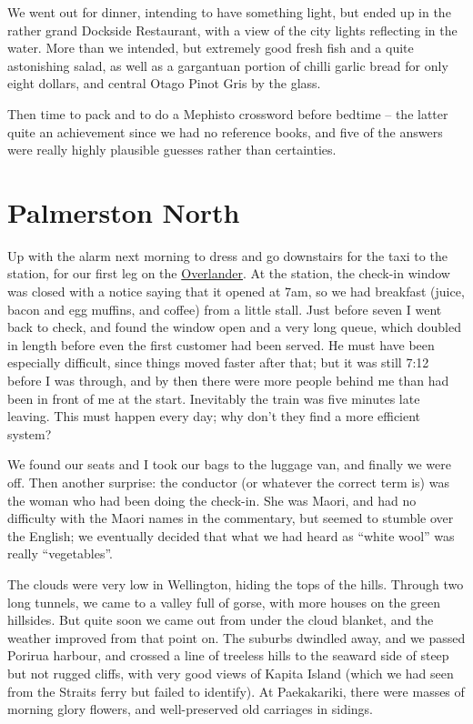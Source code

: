 \documentclass[12pt,a4paper]{article}
\begin{document}
We went out for dinner, intending to have something light, but ended up in
the rather grand Dockside Restaurant, with a view of the city lights reflecting
in the water. More than we intended, but extremely good fresh fish and a
quite astonishing salad, as well as a gargantuan portion of chilli garlic 
bread for only eight dollars, and central Otago Pinot Gris by the glass.

Then time to pack and to do a Mephisto crossword before
bedtime -- the latter quite an achievement since we had no reference books,
and five of the answers were really highly plausible guesses rather than
certainties.

\section{Palmerston North}

Up with the alarm next morning to dress and go downstairs for the taxi to
the station, for our first leg on the 
\href{http://www.tranzscenic.co.nz/services/overlander.aspx}{Overlander}.
At the station, the check-in window was closed with a notice saying that it
opened at 7am, so we had breakfast (juice, bacon and egg muffins, and coffee)
from a little stall. Just before seven I went back to check, and found the
window open and a very long queue, which doubled in length before even the
first customer had been served. He must have been especially difficult, since
things moved faster after that; but it was still 7:12 before I was through,
and by then there were more people behind me than had been in front of me
at the start. Inevitably the train was five minutes late leaving. This must
happen every day; why don't they find a more efficient system?

We found our seats and I took our bags to the luggage van, and finally we
were off. Then another surprise: the conductor (or whatever the correct
term is) was the woman who had been doing the check-in. She was Maori, and
had no difficulty with the Maori names in the commentary, but seemed to
stumble over the English; we eventually decided that what we had heard as
``white wool'' was really ``vegetables''.

The clouds were very low in Wellington, hiding the tops of the hills. Through
two long tunnels, we came to a valley full of gorse, with more houses on the
green hillsides. But quite soon we came out from under the cloud blanket,
and the weather improved from that point on. The suburbs dwindled away, and 
we passed Porirua harbour, and crossed a line of treeless hills to the 
seaward side of steep but not rugged cliffs, with very good views of
Kapita Island (which we had seen from the Straits ferry but failed to
identify). At Paekakariki, there were masses of morning glory flowers,
and well-preserved old carriages in sidings.
\end{document}
